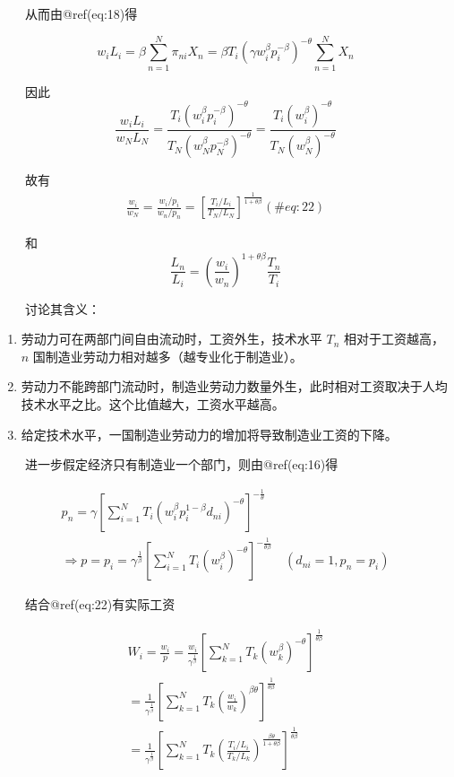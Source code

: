 \documentclass[]{tufte-handout}
\providecommand{\tightlist}{%
  \setlength{\itemsep}{0pt}\setlength{\parskip}{0pt}}
\begin{document}
　　从而由@ref(eq:18)得

\[
w_{i} L_{i}=\beta \sum_{n=1}^{N} \pi_{n i} X_{n}=\beta T_{i}\left(\gamma w_{i}^{\beta} p_{i}^{-\beta}\right)^{-\theta} \sum_{n=1}^{N} X_{n}
\]

　　因此
\[\frac{w_{i} L_{i}}{w_{N} L_{N}}=\frac{T_{i}\left(w_{i}^{\beta} p_{i}^{-\beta}\right)^{-\theta}}{T_{N}\left(w_{N}^{\beta} p_{N}^{-\beta}\right)^{-\theta}}=\frac{T_{i}\left(w_{i}^{\beta}\right)^{-\theta}}{T_{N}\left(w_{N}^{\beta}\right)^{-\theta}}\]

　　故有 \begin{align}
\frac{w_{i}}{w_{N}}=\frac{w_i/p_i}{w_n/p_n}=\left[\frac{T_{i} / L_{i}}{T_{N} / L_{N}}\right]^{\frac{1}{1+\theta \beta}} (\#eq:22)
\end{align}

　　和
\[\frac{L_n}{L_i}=\left(\frac{w_i}{w_n}\right)^{1+\theta\beta}\frac{T_n}{T_i}\]

　　讨论其含义：

\begin{enumerate}
\def\labelenumi{\arabic{enumi}.}
\tightlist
\item
  劳动力可在两部门间自由流动时，工资外生，技术水平 \(T_n\)
  相对于工资越高，\(n\) 国制造业劳动力相对越多（越专业化于制造业）。\\
\item
  劳动力不能跨部门流动时，制造业劳动力数量外生，此时相对工资取决于人均技术水平之比。这个比值越大，工资水平越高。
\item
  给定技术水平，一国制造业劳动力的增加将导致制造业工资的下降。
\end{enumerate}

　　进一步假定经济只有制造业一个部门，则由@ref(eq:16)得

\[
\begin{array}{l}{p_{n}=\gamma\left[\sum_{i=1}^{N} T_{i}\left(w_{i}^{\beta} p_{i}^{1-\beta} d_{n i}\right)^{-\theta}\right]^{-\frac{1}{\theta}}} \\ {\Rightarrow p=p_{i}=\gamma^{\frac{1}{\beta}}\left[\sum_{i=1}^{N} T_{i}\left(w_{i}^{\beta}\right)^{-\theta}\right]^{-\frac{1}{\theta \beta}} \quad\left(d_{n i}=1, p_{n}=p_{i}\right)}\end{array}
\]

　　结合@ref(eq:22)有实际工资

\[
\begin{array}{l}{W_{i}=\frac{w_{i}}{p}=\frac{w_{i}}{\gamma^{\frac{1}{\beta}}}\left[\sum_{k=1}^{N} T_{k}\left(w_{k}^{\beta}\right)^{-\theta}\right]^{\frac{1}{\theta \beta}}} \\ {=\frac{1}{\gamma^{\frac{1}{\beta}}}\left[\sum_{k=1}^{N} T_{k}\left(\frac{w_{i}}{w_{k}}\right)^{\beta \theta}\right]^{\frac{1}{\theta \beta}}} \\ {=\frac{1}{\gamma^{\frac{1}{\beta}}}\left[\sum_{k=1}^{N} T_{k}\left(\frac{T_{i} / L_{i}}{T_{k} / L_{k}}\right)^{\frac{\beta \theta}{1+\theta \beta}}\right]^{\frac{1}{\theta \beta}}}\end{array}
\]
\end{document}
